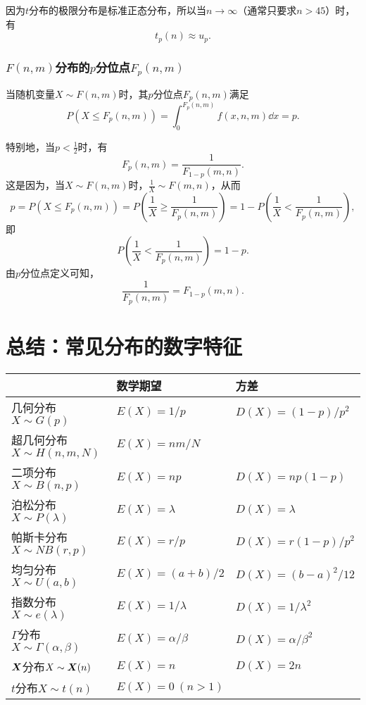 因为\(t\)分布的极限分布是标准正态分布，所以当\(n\to\infty\)（通常只要求\(n>45\)）时，有\[
t_p(n) \approx u_p.
\]

\subsubsection{\texorpdfstring{\(F(n,m)\)分布的\(p\)分位点\(F_p(n,m)\)}{F分布的p分位点}}
当随机变量\(X \sim F(n,m)\)时，其\(p\)分位点\(F_p(n,m)\)满足\[
P(X \leqslant F_p(n,m)) = \int_0^{F_p(n,m)} f(x,n,m) \dd{x} = p.
\]

特别地，当\(p<\frac{1}{2}\)时，有\begin{equation}
F_p(n,m) = \frac{1}{F_{1-p}(m,n)}.
\end{equation}
这是因为，当\(X \sim F(n,m)\)时，\(\frac{1}{X} \sim F(m,n)\)，从而\[
p = P(X \leqslant F_p(n,m))
= P\left(\frac{1}{X} \geqslant \frac{1}{F_p(n,m)}\right)
= 1 - P\left(\frac{1}{X} < \frac{1}{F_p(n,m)}\right),
\]即\[
P\left(\frac{1}{X} < \frac{1}{F_p(n,m)}\right) = 1 - p.
\]由\(p\)分位点定义可知，\[
\frac{1}{F_p(n,m)} = F_{1-p}(m,n).
\]

\section{总结：常见分布的数字特征}
\begin{center}
\begin{tabular}{p{4cm}p{4cm}p{4cm}}
\hline
& 数学期望 & 方差 \\ \hline
几何分布\newline\(X \sim G(p)\) & \(E(X) = 1/p\) & \(D(X) = (1-p)/p^2\) \\ \hline
超几何分布\newline\(X \sim H(n,m,N)\) & \(E(X) = nm/N\) \\ \hline
二项分布\newline\(X \sim B(n,p)\) & \(E(X) = np\) & \(D(X) = np(1-p)\) \\ \hline
泊松分布\newline\(X \sim P(\lambda)\) & \(E(X) = \lambda\) & \(D(X) = \lambda\) \\ \hline
帕斯卡分布\newline\(X \sim NB(r,p)\) & \(E(X) = r/p\) & \(D(X) = r(1-p)/p^2\) \\ \hline
均匀分布\newline\(X \sim U(a,b)\) & \(E(X) = (a+b)/2\) & \(D(X) = (b-a)^2/12\) \\ \hline
指数分布\newline\(X \sim e(\lambda)\) & \(E(X) = 1/\lambda\) & \(D(X) = 1/\lambda^2\) \\ \hline
\(\Gamma\)分布\newline\(X \sim \Gamma(\alpha,\beta)\) & \(E(X) = \alpha/\beta\) & \(D(X) = \alpha/\beta^2\) \\ \hline
\(\boldsymbol{X}\)分布\newline\(X \sim \boldsymbol{X}(n)\) & \(E(X) = n\) & \(D(X) = 2n\) \\ \hline
\(t\)分布\newline\(X \sim t(n)\) & \(E(X) = 0\ (n>1)\) \\ \hline
\end{tabular}
\end{center}

